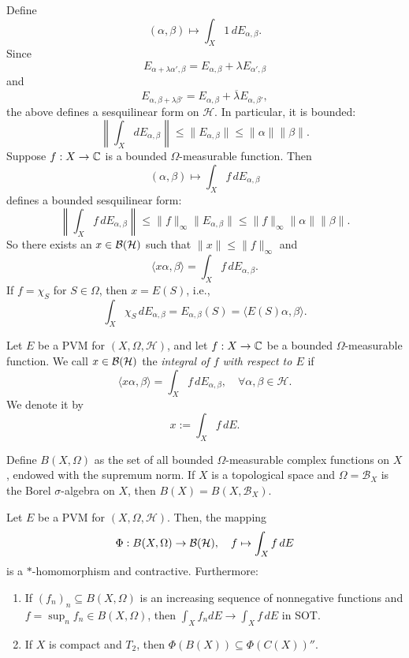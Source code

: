 Define  
$$(\alpha, \beta) \mapsto \int_X 1 \, dE_{\alpha, \beta}.$$  
Since  
$$E_{\alpha + \lambda \alpha', \beta} = E_{\alpha, \beta} + \lambda E_{\alpha', \beta}$$
and  
$$E_{\alpha, \beta + \lambda \beta'} = E_{\alpha, \beta} + \overline{\lambda} E_{\alpha, \beta'},$$
the above defines a sesquilinear form on $\mathcal{H}$. In particular, it is bounded:  
$$\left\| \int_X dE_{\alpha, \beta} \right\| \leq \| E_{\alpha, \beta}\| \leq \|\alpha\| \|\beta\|.$$  
Suppose $f: X \to \mathbb {C}$ is a bounded $\Omega$-measurable function. Then  
$$(\alpha, \beta) \mapsto \int_X f \, dE_{\alpha, \beta}$$
defines a bounded sesquilinear form:  
$$\left\| \int_X f\, dE_{\alpha, \beta} \right\| \leq \|f\|_{\infty} \| E_{\alpha, \beta}\| \leq \|f\|_{\infty} \|\alpha\| \|\beta\|.$$  
So there exists an $x \in \operatorname{\mathcal{B} (\mathcal{H})}$ such that $\| x\| \leq \| f\|_\infty$ and  
$$\langle x \alpha, \beta \rangle = \int_X f\, dE_{\alpha, \beta}.$$  
If $f = \chi_S$ for $S \in \Omega$, then $x = E(S)$, i.e.,  
$$\int_X \chi_S\, dE_{\alpha, \beta} = E_{\alpha, \beta} (S) = \langle E(S) \alpha, \beta \rangle.$$

\begin{definition}  
  Let $E$ be a PVM for $(X, \Omega, \mathcal{H})$, and let $f: X \to \mathbb {C}$ be a bounded $\Omega$-measurable function.  
  We call $x \in \operatorname{\mathcal{B} (\mathcal{H})}$ the \emph{integral of $f$ with respect to $E$} if  
  $$\langle x\alpha, \beta \rangle = \int_X f\, dE_{\alpha, \beta},\quad \forall \alpha, \beta \in \mathcal{H}.$$  
  We denote it by  
  $$  x := \int_X f\, dE.$$  
\end{definition}  

\begin{remark}  
  Define $B(X, \Omega)$ as the set of all bounded $\Omega$-measurable complex functions on $X$, endowed with the supremum norm.  
  If $X$ is a topological space and $\Omega = \mathcal{B}_X$ is the Borel $\sigma$-algebra on $X$,  
  then $B(X) = B(X, \mathcal{B}_X)$.  
\end{remark}  

\begin{proposition}\label{prop:6.1}
  Let $E$ be a PVM for $(X, \Omega, \mathcal{H})$. Then, the mapping  
  $$\Phi: B(X, \Omega) \to \operatorname{\mathcal{B} (\mathcal{H})},\quad f \mapsto \int_X f\, dE$$
  is a $*$-homomorphism and contractive. Furthermore:  
  \begin{enumerate}  
    \item If $(f_n)_n \subseteq B (X, \Omega)$ is an increasing sequence of nonnegative functions  
    and $f = \sup_n f_n \in B (X, \Omega)$, then $\int_X f_n dE \to \int_X f\, dE$ in SOT.  
    \item If $X$ is compact and $T_2$, then $\Phi (B (X)) \subseteq \Phi (C(X))''$.  
  \end{enumerate}  
\end{proposition}  


